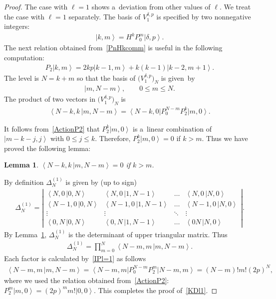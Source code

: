 \documentclass[11pt]{article}
\numberwithin{equation}{section}
\newtheorem{lemma}{Lemma}
\def\bra#1{\left\langle #1\right|}
\def\ket#1{\left| #1\right\rangle}
\def\bracket#1#2{\left\langle #1  \,\right| \left. #2 \right\rangle}
\begin{document}
\begin{proof}
The case with $ \ell = 1 $ shows a~deviation from other values of $ \ell$.
We treat the case with $ \ell = 1 $ separately.
The basis of $ V^{\delta,p}_1 $ is specif\/ied by two nonnegative integers:
\begin{gather*}
\ket{k,m} = H^k P_0^m \ket{\delta,p}.
\end{gather*}
The next relation obtained from~\eqref{PnHkcomm} is useful in the following computation:
\begin{gather}
P_2 \ket{k,m} = 2kp \ket{k-1,m} + k(k-1) \ket{k-2,m+1}.
\label{ActionP2}
\end{gather}
The level is $ N = k +m $ so that the basis of $ \big(V^{\delta,p}_1\big)_N $ is given~by
\begin{gather*}
\ket{m,N-m},
\qquad
0 \leq m \leq N.
\end{gather*}
The product of two vectors in $ \big(V^{\delta,p}_1\big)_N $ is
\begin{gather}
\bracket{N-k,k}{m,N-m} = \bra{N-k,0} P_0^{N-m} P_2^k \ket{m,0}.
\label{IPl=1}
\end{gather}

It follows from~\eqref{ActionP2} that $P_2^k \ket{m,0}$ is a~linear combination of $ \ket{m-k-j,j} $ with $0 \leq j
\leq k$.
Therefore, $ P_2^k \ket{m,0} = 0$ if $k > m$.
Thus we have proved the following lemma:

\begin{lemma}
\label{lemma1}
$ \bracket{N-k,k}{m,N-m} = 0 $ if $ k > m$.
\end{lemma}

By def\/inition $ \Delta^{(1)}_N $ is given by (up to sign)
\begin{gather*}
\Delta^{(1)}_N = \left|
\begin{matrix}
 \bracket{N,0}{0,N} & \bracket{N,0}{1,N-1} & \dots & \bracket{N,0}{N,0}
\\
\bracket{N-1,0}{0,N} & \bracket{N-1,0}{1,N-1} & \dots & \bracket{N-1,0}{N,0}
\\
\vdots & \vdots & \ddots & \vdots
\\
\bracket{0,N}{0,N} & \bracket{0,N}{1,N-1} & \dots & \bracket{0N}{N,0}
\end{matrix}
\right|.
\end{gather*}
By Lemma~\ref{lemma1}, $ \Delta^{(1)}_N $ is the determinant of upper triangular matrix.
Thus
\begin{gather*}
\Delta_N^{(1)} = \prod\limits_{m=0}^N \bracket{N-m,m}{m,N-m}.
\end{gather*}
Each factor is calculated by~\eqref{IPl=1} as follows
\begin{gather*}
\bracket{N-m,m}{m,N-m} = \bra{N-m,m} P_0^{N-m} P_2^m \ket{N-m,m} = (N-m)!   m!   (2p)^N,
\end{gather*}
where we used the relation obtained from~\eqref{ActionP2}: $ P_2^m \ket{m,0} = (2p)^m m ! \ket{0,0}$.
This completes the proof of~\eqref{KDl1}.


\end{proof}
\end{document}
